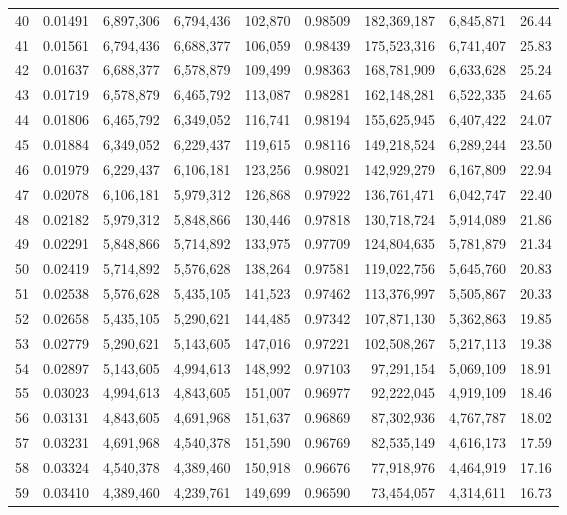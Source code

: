 \begin{longtable}{rrrrrrrrr}
40 & 0.01491 & 6,897,306 & 6,794,436 & 102,870 & 0.98509 & 182,369,187 & 6,845,871 & 26.44 \\
41 & 0.01561 & 6,794,436 & 6,688,377 & 106,059 & 0.98439 & 175,523,316 & 6,741,407 & 25.83 \\
42 & 0.01637 & 6,688,377 & 6,578,879 & 109,499 & 0.98363 & 168,781,909 & 6,633,628 & 25.24 \\
43 & 0.01719 & 6,578,879 & 6,465,792 & 113,087 & 0.98281 & 162,148,281 & 6,522,335 & 24.65 \\
44 & 0.01806 & 6,465,792 & 6,349,052 & 116,741 & 0.98194 & 155,625,945 & 6,407,422 & 24.07 \\
45 & 0.01884 & 6,349,052 & 6,229,437 & 119,615 & 0.98116 & 149,218,524 & 6,289,244 & 23.50 \\
46 & 0.01979 & 6,229,437 & 6,106,181 & 123,256 & 0.98021 & 142,929,279 & 6,167,809 & 22.94 \\
47 & 0.02078 & 6,106,181 & 5,979,312 & 126,868 & 0.97922 & 136,761,471 & 6,042,747 & 22.40 \\
48 & 0.02182 & 5,979,312 & 5,848,866 & 130,446 & 0.97818 & 130,718,724 & 5,914,089 & 21.86 \\
49 & 0.02291 & 5,848,866 & 5,714,892 & 133,975 & 0.97709 & 124,804,635 & 5,781,879 & 21.34 \\
50 & 0.02419 & 5,714,892 & 5,576,628 & 138,264 & 0.97581 & 119,022,756 & 5,645,760 & 20.83 \\
51 & 0.02538 & 5,576,628 & 5,435,105 & 141,523 & 0.97462 & 113,376,997 & 5,505,867 & 20.33 \\
52 & 0.02658 & 5,435,105 & 5,290,621 & 144,485 & 0.97342 & 107,871,130 & 5,362,863 & 19.85 \\
53 & 0.02779 & 5,290,621 & 5,143,605 & 147,016 & 0.97221 & 102,508,267 & 5,217,113 & 19.38 \\
54 & 0.02897 & 5,143,605 & 4,994,613 & 148,992 & 0.97103 & 97,291,154 & 5,069,109 & 18.91 \\
55 & 0.03023 & 4,994,613 & 4,843,605 & 151,007 & 0.96977 & 92,222,045 & 4,919,109 & 18.46 \\
56 & 0.03131 & 4,843,605 & 4,691,968 & 151,637 & 0.96869 & 87,302,936 & 4,767,787 & 18.02 \\
57 & 0.03231 & 4,691,968 & 4,540,378 & 151,590 & 0.96769 & 82,535,149 & 4,616,173 & 17.59 \\
58 & 0.03324 & 4,540,378 & 4,389,460 & 150,918 & 0.96676 & 77,918,976 & 4,464,919 & 17.16 \\
59 & 0.03410 & 4,389,460 & 4,239,761 & 149,699 & 0.96590 & 73,454,057 & 4,314,611 & 16.73 \\

\end{longtable}
